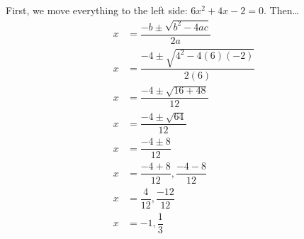 \documentclass[11pt,letterpaper]{article}
\begin{document}
\sol First, we move everything to the left side: $6x^2 + 4x - 2= 0$. Then\dots
	\[
	\begin{aligned}
	x&= \dfrac{-b \pm \sqrt{b^2 - 4ac}}{2a} \\[0.3cm]
	x&= \dfrac{-4 \pm \sqrt{4^2 - 4(6)(-2)}}{2(6)} \\[0.3cm]
	x&= \dfrac{-4 \pm \sqrt{16 + 48}}{12} \\[0.3cm]
	x&= \dfrac{-4 \pm \sqrt{64}}{12} \\[0.3cm]
	x&= \dfrac{-4 \pm 8}{12} \\[0.3cm]
	x&= \dfrac{-4 + 8}{12}, \dfrac{-4 - 8}{12} \\[0.3cm]
	x&= \dfrac{4}{12}, \dfrac{-12}{12} \\[0.3cm]
	x&= -1, \dfrac{1}{3}
	\end{aligned}
	\] 


\end{document}

